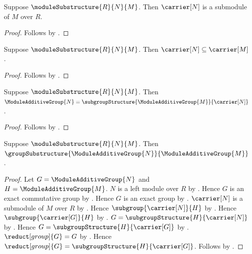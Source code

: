 \begin{proposition}\label{module_substructure_carrier_submodule}
    Suppose $\moduleSubstructure{R}{N}{M}$.
    Then $\carrier[N]$ is a submodule of $M$ over $R$.
\end{proposition}
\begin{proof}
    Follows by .
\end{proof}

\begin{corollary}\label{module_substructure_carrier_subseteq}
    Suppose $\moduleSubstructure{R}{N}{M}$.
    Then $\carrier[N]\subseteq\carrier[M]$.
\end{corollary}
\begin{proof}
    Follows by
        .
\end{proof}

\begin{proposition}\label{module_substructure_additive_group}
    Suppose $\moduleSubstructure{R}{N}{M}$.
    Then $\ModuleAdditiveGroup{N}
        =\subgroupStructure{\ModuleAdditiveGroup{M}}{\carrier[N]}$.
\end{proposition}
\begin{proof}
    Follows by .
\end{proof}

\begin{theorem}\label{module_substructure_is_additive_group_substructure}
    Suppose $\moduleSubstructure{R}{N}{M}$.
    Then $\groupSubstructure{\ModuleAdditiveGroup{N}}{
        \ModuleAdditiveGroup{M}}$.
\end{theorem}
\begin{proof}
    Let $G=\ModuleAdditiveGroup{N}$ and
        $H=\ModuleAdditiveGroup{M}$.
    $N$ is a left module over $R$ by
        .
    Hence $G$ is an exact commutative group by
        .
    Hence $G$ is an exact group by
        .
    $\carrier[N]$ is a submodule of $M$ over $R$ by
        .
    Hence $\subgroup{\carrier[N]}{H}$ by
        .
    Hence $\subgroup{\carrier[G]}{H}$ by
        .
    $G=\subgroupStructure{H}{\carrier[N]}$ by
        .
    Hence $G=\subgroupStructure{H}{\carrier[G]}$ by
        .
    $\reduct[group]{G}=G$ by .
    Hence $\reduct[group]{G}
        =\subgroupStructure{H}{\carrier[G]}$.
    Follows by .
\end{proof}

